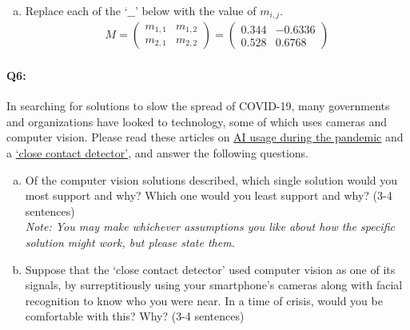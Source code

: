 \begin{enumerate}[(a)]
    \item Replace each of the `$\_\_$' below with the value of $m_{i, j}$.
          \begin{align}
              M = \begin{pmatrix} m_{1,1} & m_{1,2} \\ m_{2,1} & m_{2,2} \end{pmatrix} = \begin{pmatrix} 0.344 & -0.6336 \\ 0.528 & 0.6768 \end{pmatrix}
          \end{align}

\end{enumerate}


\pagebreak
\paragraph{Q6:}
In searching for solutions to slow the spread of COVID-19, many governments and organizations have looked to technology, some of which uses cameras and computer vision. Please read these articles on
\href{https://thenextweb.com/neural/2020/03/21/why-ai-might-be-the-most-effective-weapon-we-have-to-fight-covid-19/}{AI usage during the pandemic} and a \href{https://www.bbc.com/news/technology-51439401}{‘close contact detector’}, and answer the following questions.
\begin{enumerate}[(a)]

    \item
          Of the computer vision solutions described, which single solution would you most support and why?
          Which one would you least support and why? (3-4 sentences) \\
          \emph{Note: You may make whichever assumptions you like about how the specific solution might work, but please state them.}

    \item
          Suppose that the `close contact detector' used computer vision as one of its signals, by surreptitiously using your smartphone's cameras along with facial recognition to know who you were near. In a time of crisis, would you be comfortable with this? Why? (3-4 sentences)
\end{enumerate}

